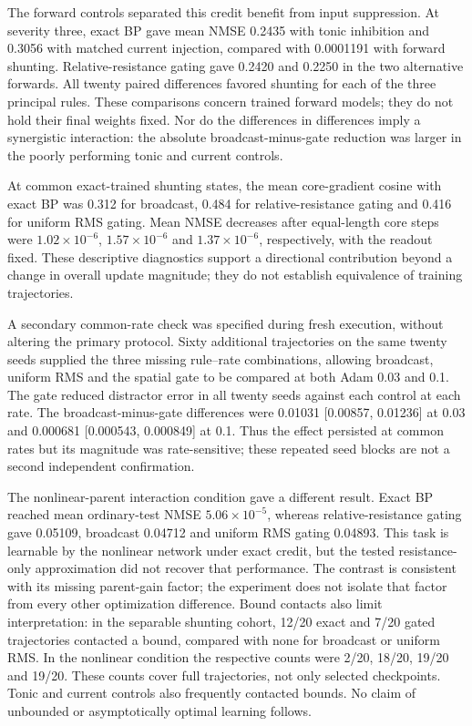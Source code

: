 The forward controls separated this credit benefit from input suppression.
At severity three, exact BP gave mean NMSE 0.2435 with tonic inhibition and
0.3056 with matched current injection, compared with 0.0001191 with
forward shunting. Relative-resistance gating gave 0.2420 and 0.2250 in the
two alternative forwards. All twenty paired differences favored shunting
for each of the three principal rules. These comparisons concern trained
forward models; they do not hold their final weights fixed. Nor do the
differences in differences imply a synergistic interaction: the absolute
broadcast-minus-gate reduction was larger in the poorly performing
tonic and current controls.

At common exact-trained shunting states, the mean core-gradient cosine with
exact BP was 0.312 for broadcast, 0.484 for relative-resistance gating and
0.416 for uniform RMS gating. Mean NMSE decreases after equal-length core
steps were $1.02\times10^{-6}$, $1.57\times10^{-6}$ and
$1.37\times10^{-6}$, respectively, with the readout fixed. These descriptive
diagnostics support a directional contribution beyond a change in overall
update magnitude; they do not establish equivalence of training trajectories.

A secondary common-rate check was specified during fresh execution,
without altering the primary protocol. Sixty additional trajectories on
the same twenty seeds supplied the three missing rule--rate combinations,
allowing broadcast, uniform RMS and the spatial gate to be compared at both
Adam 0.03 and 0.1. The gate reduced distractor error in all twenty seeds
against each control at each rate. The broadcast-minus-gate differences
were 0.01031 [0.00857, 0.01236] at 0.03 and
0.000681 [0.000543, 0.000849] at 0.1. Thus the effect persisted at common
rates but its magnitude was rate-sensitive; these repeated seed blocks
are not a second independent confirmation.

The nonlinear-parent interaction condition gave a different result.
Exact BP reached mean ordinary-test NMSE $5.06\times10^{-5}$, whereas
relative-resistance gating gave 0.05109, broadcast 0.04712 and uniform
RMS gating 0.04893. This task is learnable by the nonlinear network under
exact credit, but the tested resistance-only approximation did not recover
that performance. The contrast is consistent with its missing parent-gain
factor; the experiment does not isolate that factor from every other
optimization difference. Bound contacts also limit interpretation: in the
separable shunting cohort, 12/20 exact and 7/20 gated trajectories contacted
a bound, compared with none for broadcast or uniform RMS. In the nonlinear
condition the respective counts were 2/20, 18/20, 19/20 and 19/20. These
counts cover full trajectories, not only selected checkpoints. Tonic and
current controls also frequently contacted bounds. No claim of unbounded
or asymptotically optimal learning follows.

